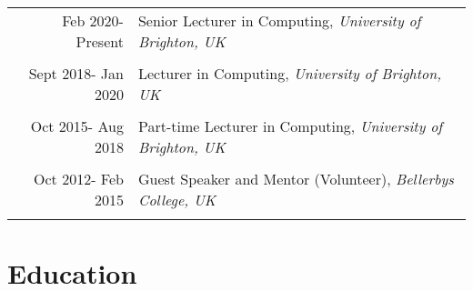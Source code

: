 \documentclass[a4paper,11pt]{article} %
\begin{document}
\begin{tabular}{r|p{11cm}}

Feb 2020- Present & Senior Lecturer in Computing, \emph{University of Brighton, UK}\\
\multicolumn{2}{c}{} \\


Sept 2018- Jan 2020 & Lecturer in Computing, \emph{University of Brighton, UK}\\
\multicolumn{2}{c}{} \\


Oct 2015- Aug 2018 & Part-time Lecturer in Computing, \emph{University of Brighton, UK}\\
\multicolumn{2}{c}{} \\


Oct 2012- Feb 2015 & Guest Speaker and Mentor (Volunteer), \emph{Bellerbys College, UK}\\
\multicolumn{2}{c}{} \\

\end{tabular}


\section{Education}
\end{document}
